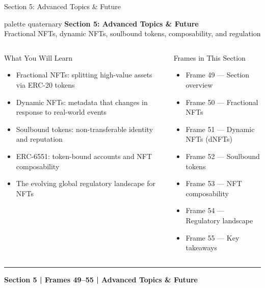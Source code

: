 \documentclass[8pt,aspectratio=169]{beamer}
\newcommand{\bottomnote}[1]{\vfill\vspace{-2mm}\textcolor{mllavender2}{\rule{\textwidth}{0.4pt}}\vspace{1mm}\footnotesize\textbf{#1}}
\begin{document}
\begin{frame}{Section 5: Advanced Topics \& Future}
\begin{beamercolorbox}[sep=12pt,center,rounded=true,shadow=true]{palette quaternary}
  {\Large\bfseries Section 5: Advanced Topics \& Future}\\[4pt]
  {\normalsize Fractional NFTs, dynamic NFTs, soulbound tokens, composability, and regulation}
\end{beamercolorbox}

\vspace{4mm}
\begin{columns}[T]
\begin{block}{What You Will Learn}
\begin{itemize}\setlength{\itemsep}{2pt}
  \item Fractional NFTs: splitting high-value assets via ERC-20 tokens
  \item Dynamic NFTs: metadata that changes in response to real-world events
  \item Soulbound tokens: non-transferable identity and reputation
  \item ERC-6551: token-bound accounts and NFT composability
  \item The evolving global regulatory landscape for NFTs
\end{itemize}
\end{block}
\begin{block}{Frames in This Section}
\begin{itemize}\setlength{\itemsep}{1pt}
  \item Frame 49 --- Section overview
  \item Frame 50 --- Fractional NFTs
  \item Frame 51 --- Dynamic NFTs (dNFTs)
  \item Frame 52 --- Soulbound tokens
  \item Frame 53 --- NFT composability
  \item Frame 54 --- Regulatory landscape
  \item Frame 55 --- Key takeaways
\end{itemize}
\end{block}
\end{columns}
\bottomnote{Section 5 | Frames 49--55 | Advanced Topics \& Future}
\end{frame}
\end{document}
